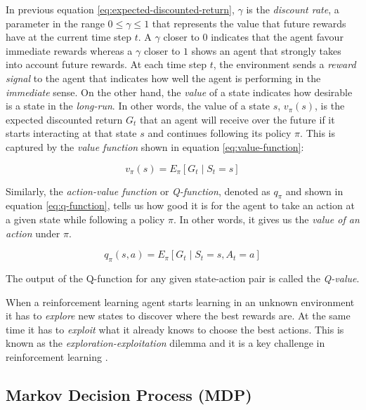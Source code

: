 In previous equation \ref{eq:expected-discounted-return}, $\gamma$ is the \textit{discount rate}, a parameter in the range $0 \leq \gamma \leq 1$ that represents the value that future rewards have at the current time step $t$. A $\gamma$ closer to $0$ indicates that the agent favour immediate rewards whereas a $\gamma$ closer to $1$ shows an agent that strongly takes into account future rewards. At each time step $t$, the environment sends a \textit{reward signal} to the agent that indicates how well the agent is performing in the \textit{immediate} sense. On the other hand, the \textit{value} of a state indicates how desirable is a state in the \textit{long-run}. In other words, the value of a state $s$, $v_\pi \left(s\right) $, is the expected discounted return $G_t$ that an agent will receive over the future if it starts interacting at that state $s$ and continues following its policy $\pi$. This is captured by the \textit{value function} shown in equation \ref{eq:value-function}:






\begin{equation}
v_\pi \left(s\right) = E_\pi \left[G_{t}\mid S_{t}=s\right]
\label{eq:value-function}
\end{equation}



Similarly, the \textit{action-value function} or \textit{Q-function}, denoted as $q_\pi$ and shown in equation \ref{eq:q-function}, tells us how good it is for the agent to take an action at a given state while following a policy $\pi$. In other words, it gives us the \textit{value of an action} under $\pi$.

\begin{equation}
q_\pi \left( s,a \right) = E_\pi \left[ G_{t}\mid S_{t}=s,A_{t}=a \right] 
\label{eq:q-function}
\end{equation}


The output of the Q-function for any given state-action pair is called the \textit{Q-value}. 

When a reinforcement learning agent starts learning in an unknown environment it has to \textit{explore} new states to discover where the best rewards are. At the same time it has to \textit{exploit} what it already knows to choose the best actions. This is known as the \textit{exploration-exploitation }dilemma and it is a key challenge in reinforcement learning \cite{Sutton:1998}.


\subsection{Markov Decision Process (MDP)}
\label{subsection:MDP}


